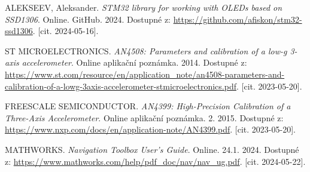 \begin{thebibliography}{99}
ALEKSEEV, Aleksander. \textit{STM32 library for working with OLEDs based on SSD1306}. Online. GitHub. 2024. Dostupné z: \url{https://github.com/afiskon/stm32-ssd1306}. [cit. 2024-05-16].

ST MICROELECTRONICS. \textit{AN4508: Parameters and calibration of a low-g 3-axis accelerometer}. Online aplikační poznámka. 2014. Dostupné z: \url{https://www.st.com/resource/en/application\_note/an4508-parameters-and-calibration-of-a-lowg-3axis-accelerometer-stmicroelectronics.pdf}. [cit. 2023-05-20].

FREESCALE SEMICONDUCTOR. \textit{AN4399: High-Precision Calibration of a Three-Axis Accelerometer}. Online aplikační poznámka. 2. 2015. Dostupné z: \url{https://www.nxp.com/docs/en/application-note/AN4399.pdf}. [cit. 2023-05-20].

MATHWORKS. \textit{Navigation Toolbox User's Guide}. Online. 24.1. 2024. Dostupné z: \url{https://www.mathworks.com/help/pdf\_doc/nav/nav\_ug.pdf}. [cit. 2024-05-22].

\end{thebibliography}